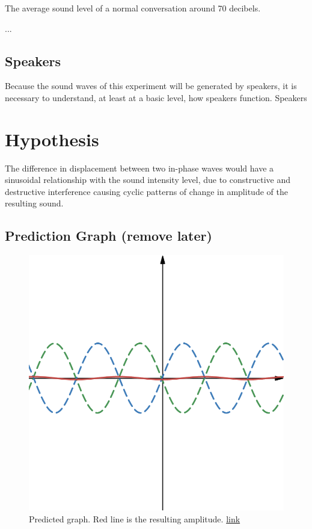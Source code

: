 \documentclass[12pt]{article}
\begin{document}
The average sound level of a normal conversation around 70 decibels.

...

\subsection{Speakers}

Because the sound waves of this experiment will be generated by speakers, it is necessary to understand, at least at a basic level, how speakers function. Speakers

\section{Hypothesis}

The difference in displacement between two in-phase waves would have a sinusoidal relationship with the sound intensity level, due to constructive and destructive interference causing cyclic patterns of change in amplitude of the resulting sound.

\subsection{Prediction Graph (remove later)}


\begin{figure}[H]
    \centering
    \includegraphics[scale=0.3]{prediction.png}
    \caption{Predicted graph. Red line is the resulting amplitude. \href{https://www.desmos.com/calculator/ahmohu46il}{link}}
\end{figure}
\end{document}

